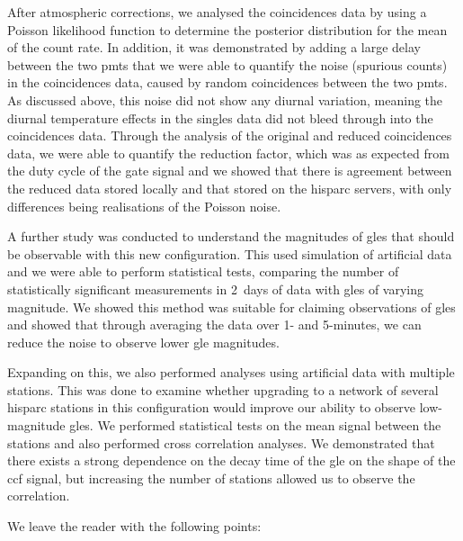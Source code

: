 After atmospheric corrections, we analysed the coincidences data by using a Poisson likelihood function to determine the posterior distribution for the mean of the count rate. In addition, it was demonstrated by adding a large delay between the two \glspl{pmt} that we were able to quantify the noise (spurious counts) in the coincidences data, caused by random coincidences between the two \glspl{pmt}. As discussed above, this noise did not show any diurnal variation, meaning the diurnal temperature effects in the singles data did not bleed through into the coincidences data. Through the analysis of the original and reduced coincidences data, we were able to quantify the reduction factor, which was as expected from the duty cycle of the gate signal and we showed that there is agreement between the reduced data stored locally and that stored on the \gls{hisparc} servers, with only differences being realisations of the Poisson noise.

A further study was conducted to understand the magnitudes of \glspl{gle} that should be observable with this new configuration. This used simulation of artificial data and we were able to perform statistical tests, comparing the number of statistically significant measurements in 2~days of data with \glspl{gle} of varying magnitude. We showed this method was suitable for claiming observations of \glspl{gle} and showed that through averaging the data over 1- and 5-minutes, we can reduce the noise to observe lower \gls{gle} magnitudes.

Expanding on this, we also performed analyses using artificial data with multiple stations. This was done to examine whether upgrading to a network of several \gls{hisparc} stations in this configuration would improve our ability to observe low-magnitude \glspl{gle}. We performed statistical tests on the mean signal between the stations and also performed cross correlation analyses. We demonstrated that there exists a strong dependence on the decay time of the \gls{gle} on the shape of the \gls{ccf} signal, but increasing the number of stations allowed us to observe the correlation.


We leave the reader with the following points:

